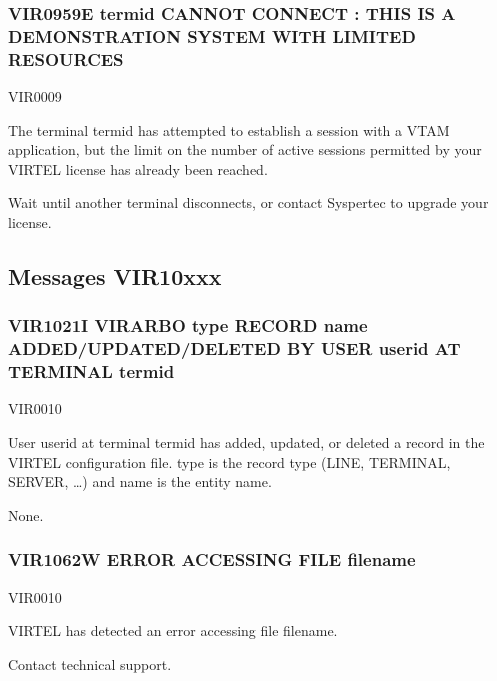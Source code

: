 \documentclass[letterpaper,10pt,english]{sphinxmanual}
\begin{document}
\subsubsection{VIR0959E termid CANNOT CONNECT : THIS IS A DEMONSTRATION SYSTEM WITH LIMITED RESOURCES}
\label{\detokenize{messages:vir0959e-termid-cannot-connect-this-is-a-demonstration-system-with-limited-resources}}\begin{description}
\sphinxAtStartPar
VIR0009

\sphinxAtStartPar
The terminal termid has attempted to establish a session with a VTAM application, but the limit on the number of active sessions permitted by your VIRTEL license has already been reached.

\sphinxAtStartPar
Wait until another terminal disconnects, or contact Syspertec to upgrade your license.

\end{description}


\subsection{Messages VIR10xxx}
\label{\detokenize{messages:messages-vir10xxx}}

\subsubsection{VIR1021I VIRARBO type RECORD name ADDED/UPDATED/DELETED BY USER userid AT TERMINAL termid}
\label{\detokenize{messages:vir1021i-virarbo-type-record-name-added-updated-deleted-by-user-userid-at-terminal-termid}}\begin{description}
\sphinxAtStartPar
VIR0010

\sphinxAtStartPar
User userid at terminal termid has added, updated, or deleted a record in the VIRTEL configuration file. type is the record type (LINE, TERMINAL, SERVER, …) and name is the entity name.

\sphinxAtStartPar
None.

\end{description}


\subsubsection{VIR1062W ERROR ACCESSING FILE filename}
\label{\detokenize{messages:vir1062w-error-accessing-file-filename}}\begin{description}
\sphinxAtStartPar
VIR0010

\sphinxAtStartPar
VIRTEL has detected an error accessing file filename.

\sphinxAtStartPar
Contact technical support.

\end{description}
\end{document}
